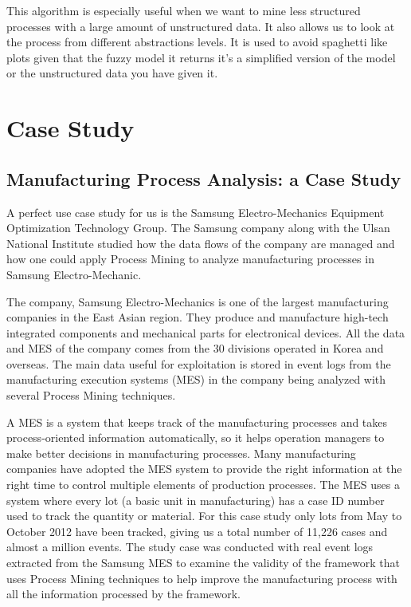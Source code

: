 \documentclass[conference]{IEEEtran}
\begin{document}
This algorithm is especially useful when we want to mine less structured processes with a large amount of unstructured data. It also allows us to look at the process from different abstractions levels.
It is used to avoid spaghetti like plots given that the fuzzy model it returns it’s a simplified version of the model or the unstructured data you have given it.

\section{Case Study}

\subsection{Manufacturing Process Analysis: a Case Study}

A perfect use case study for us is the Samsung Electro-Mechanics Equipment Optimization Technology Group. The Samsung company along with the Ulsan National Institute studied how the data flows of the company are managed and how one could apply Process Mining to analyze manufacturing processes in Samsung Electro-Mechanic. 

The company, Samsung Electro-Mechanics is one of the largest manufacturing companies in the East Asian region. They produce and manufacture high-tech integrated components and mechanical parts for electronical devices. All the data and MES of the company comes from the 30 divisions operated in Korea and overseas. The main data useful for exploitation is stored in event logs from the manufacturing execution systems (MES) in the company being analyzed with several Process Mining techniques. 

A MES is a system that keeps track of the manufacturing processes and takes process-oriented information automatically, so it helps operation managers to make better decisions in manufacturing processes. Many manufacturing companies have adopted the MES system to provide the right information at the right time to control multiple elements of production processes. The MES uses a system where every lot (a basic unit in manufacturing) has a case ID number used to track the quantity or material. For this case study only lots from May to October 2012 have been tracked, giving us a total number of 11,226 cases and almost a million events. The study case was conducted with real event logs extracted from the Samsung MES to examine the validity of the framework that uses Process Mining techniques to help improve the manufacturing process with all the information processed by the framework.
\end{document}

